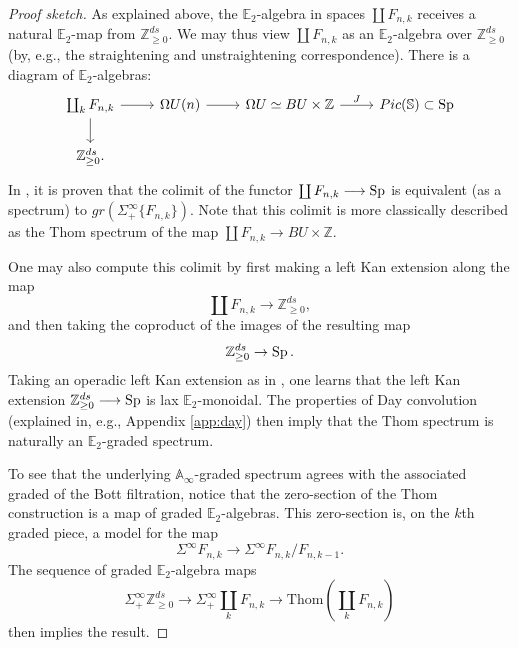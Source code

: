 \begin{proof}[Proof sketch]
As explained above, the $\mathbb{E}_2$-algebra in spaces $\coprod F_{n,k}$ receives a natural $\mathbb{E}_2$-map from $\mathbb{Z}^{ds}_{\ge 0}$.  We may thus view $\coprod F_{n,k}$ as an $\mathbb{E}_2$-algebra over $\mathbb{Z}^{ds}_{\ge 0}$ (by, e.g., the straightening and unstraightening correspondence).  There is a diagram of $\mathbb{E}_2$-algebras:
$$
\begin{tikzcd}
\coprod_k F_{n,k} \arrow{d} \arrow{r} & \Omega U(n) \arrow{r} & \Omega U \simeq BU \times \mathbb{Z} \arrow{r}{J} & Pic(\mathbb{S}) \subset \Sp \\
\mathbb{Z}^{ds}_{\ge 0}.
\end{tikzcd}
$$
In \cite[1.7]{Segal}, it is proven that the colimit of the functor $\coprod F_{n,k} \longrightarrow \operatorname{\mathrm{Sp}}$ is equivalent (as a spectrum) to $gr(\Sigma^{\infty}_+ \{F_{n,k}\})$.  Note that this colimit is more classically described as the Thom spectrum of the map $\coprod F_{n,k} \longrightarrow BU \times \mathbb{Z}$.

One may also compute this colimit by first making a left Kan extension along the map $$\coprod F_{n,k} \rightarrow \mathbb{Z}^{ds}_{\ge 0},$$ and then taking the coproduct of the images of the resulting map $$\mathbb{Z}^{ds}_{\ge 0} \rightarrow \operatorname{\mathrm{Sp}}.$$  Taking an operadic left Kan extension as in \cite[3.1.2]{HA}, one learns that the left Kan extension $\mathbb{Z}^{ds}_{\ge 0} \longrightarrow \operatorname{\mathrm{Sp}}$ is lax $\mathbb{E}_2$-monoidal.  The properties of Day convolution (explained in, e.g., Appendix \ref{app:day}) then imply that the Thom spectrum is naturally an $\mathbb{E}_2$-graded spectrum.

To see that the underlying $\mathbb{A}_\infty$-graded spectrum agrees with the associated graded of the Bott filtration, notice that the zero-section of the Thom construction is a map of graded $\mathbb{E}_2$-algebras.  This zero-section is, on the $k$th graded piece, a model for the map $$\Sigma^{\infty} F_{n,k} \longrightarrow \Sigma^{\infty} F_{n,k}/F_{n,k-1}.$$
The sequence of graded $\mathbb{E}_2$-algebra maps
$$\Sigma^{\infty}_+ \mathbb{Z}^{ds}_{\ge 0} \longrightarrow \Sigma^{\infty}_+ \coprod_k F_{n,k} \longrightarrow \text{Thom}\left( \coprod_k F_{n,k} \right)$$
then implies the result.
\end{proof}